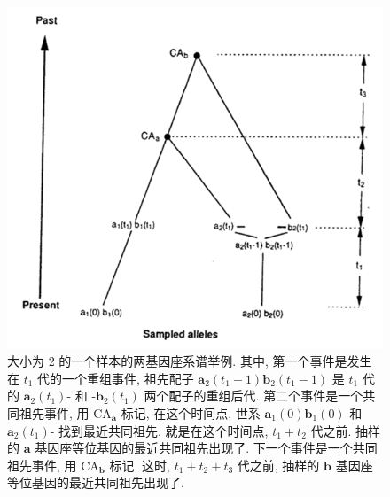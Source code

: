 \documentclass[12pt]{article}
\begin{document}
\begin{figure}
    \centering
    \includegraphics{coalescent-process.images/image3.png}
    \caption{大小为 2 的一个样本的两基因座系谱举例. 其中, 第一个事件是发生在 $t_{1}$ 代的一个重组事件, 祖先配子
        $\mathbf{a}_{2}(t_{1}-1)\mathbf{b}_{2}(t_{1}-1)$ 是 $t_{1}$ 代的 $\mathbf{a}_{2}(t_{1})\text{-}$ 和
        $\text{-}\mathbf{b}_{2}(t_{1})$ 两个配子的重组后代. 第二个事件是一个共同祖先事件, 用 $\text{CA}_{\mathbf{a}}$
        标记, 在这个时间点, 世系 $\mathbf{a}_{1}(0)\mathbf{b}_{1}(0)$ 和 $\mathbf{a}_{2}(t_{1})\text{-}$
        找到最近共同祖先. 就是在这个时间点, $t_{1}+t_{2}$ 代之前. 抽样的 $\mathbf{a}$ 基因座等位基因的最近共同祖先出现了.
        下一个事件是一个共同祖先事件, 用 $\text{CA}_{\mathbf{b}}$ 标记. 这时, $t_{1}+t_{2}+t_{3}$ 代之前, 抽样的
        $\mathbf{b}$ 基因座等位基因的最近共同祖先出现了.}
    \label{fig:3}
\end{figure}
\end{document}

